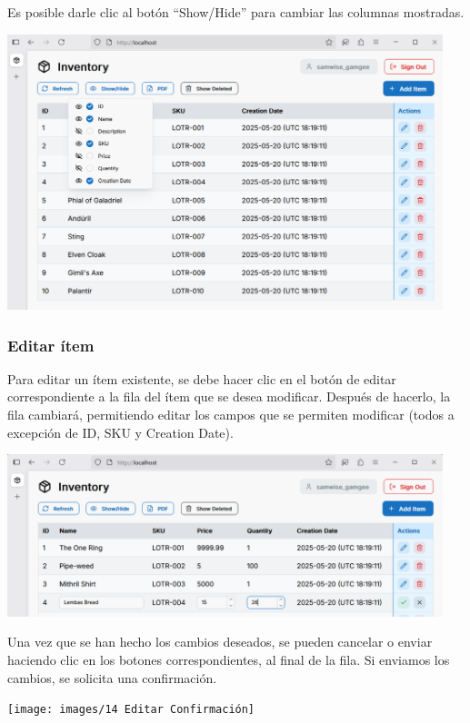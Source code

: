 Es posible darle clic al botón “Show/Hide” para cambiar las columnas mostradas.

\begin{center}
\includegraphics[width=0.95\textwidth]{images/12 Campos Mostrados}
\end{center}

\subsubsection{Editar ítem}

Para editar un ítem existente, se debe hacer clic en el botón de editar correspondiente a la fila del ítem que se desea modificar. Después de hacerlo, la fila cambiará, permitiendo editar los campos que se permiten modificar (todos a excepción de ID, SKU y Creation Date).

\begin{center}
\includegraphics[width=0.95\textwidth]{images/13 Editar}
\end{center}

Una vez que se han hecho los cambios deseados, se pueden cancelar o enviar haciendo clic en los botones correspondientes, al final de la fila. Si enviamos los cambios, se solicita una confirmación.

\begin{center}
\texttt{[image: images/14 Editar Confirmación]}
\end{center}

